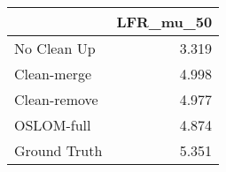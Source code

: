 \begin{tabular}{lr}
\toprule
{} & LFR_mu_50 \\
\midrule
No Clean Up  &     3.319 \\
Clean-merge  &     4.998 \\
Clean-remove &     4.977 \\
OSLOM-full   &     4.874 \\
Ground Truth &     5.351 \\
\bottomrule
\end{tabular}
